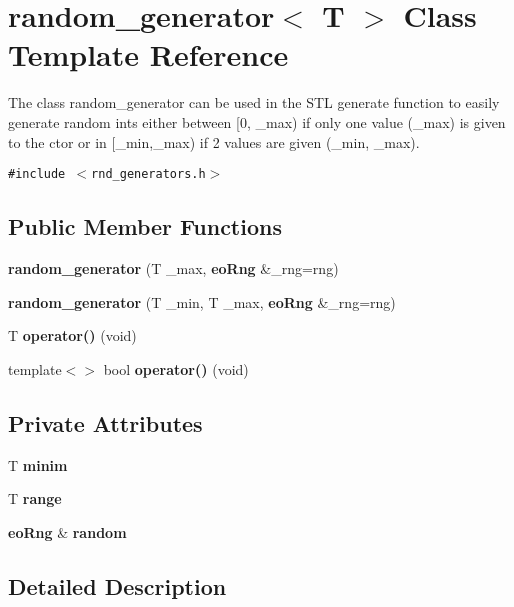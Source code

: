 \section{random\_\-generator$<$ T $>$ Class Template Reference}
\label{classrandom__generator}
The class random\_\-generator can be used in the STL generate function to easily generate random ints either between [0, \_\-max) if only one value (\_\-max) is given to the ctor or in [\_\-min,\_\-max) if 2 values are given (\_\-min, \_\-max).  


{\tt \#include $<$rnd\_\-generators.h$>$}

\subsection*{Public Member Functions}
\begin{CompactItemize}
\item 
{\bf random\_\-generator} (T \_\-max, {\bf eo\-Rng} \&\_\-rng=rng)\label{classrandom__generator_a0}

\item 
{\bf random\_\-generator} (T \_\-min, T \_\-max, {\bf eo\-Rng} \&\_\-rng=rng)\label{classrandom__generator_a1}

\item 
T {\bf operator()} (void)\label{classrandom__generator_a2}

\item 
template$<$$>$ bool {\bf operator()} (void)\label{classrandom__generator_a3}

\end{CompactItemize}
\subsection*{Private Attributes}
\begin{CompactItemize}
\item 
T {\bf minim}\label{classrandom__generator_r0}

\item 
T {\bf range}\label{classrandom__generator_r1}

\item 
{\bf eo\-Rng} \& {\bf random}\label{classrandom__generator_r2}

\end{CompactItemize}


\subsection{Detailed Description}
